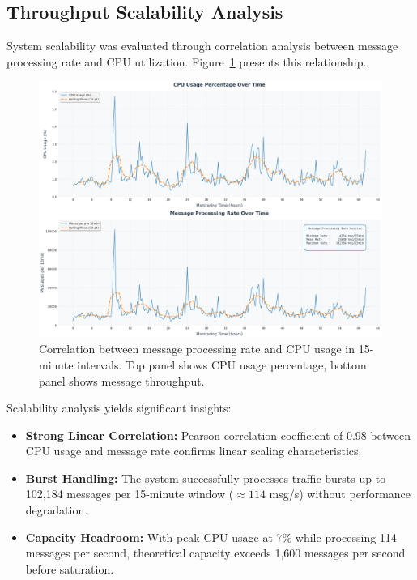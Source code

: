 \documentclass[12pt,a4paper]{article}
\begin{document}
\subsection{Throughput Scalability Analysis}
\label{sec:throughput_analysis}

System scalability was evaluated through correlation analysis between message processing rate and CPU utilization. Figure~\ref{fig:cpu_vs_messages} presents this relationship.

\begin{figure}[H]
    \centering
    \includegraphics[width=\textwidth]{../plots/62-hours/cpu_load_vs_message_throughput.png}
    \caption{Correlation between message processing rate and CPU usage in 15-minute intervals. Top panel shows CPU usage percentage, bottom panel shows message throughput.}
    \label{fig:cpu_vs_messages}
\end{figure}

Scalability analysis yields significant insights:

\begin{itemize}
    \item \textbf{Strong Linear Correlation:} Pearson correlation coefficient of 0.98 between CPU usage and message rate confirms linear scaling characteristics.
    
    \item \textbf{Burst Handling:} The system successfully processes traffic bursts up to 102,184 messages per 15-minute window ($\approx 114$ msg/s) without performance degradation.        

    \item \textbf{Capacity Headroom:} With peak CPU usage at 7\% while processing 114 messages per second, theoretical capacity exceeds 1,600 messages per second before saturation.
    
\end{itemize}
\end{document}
